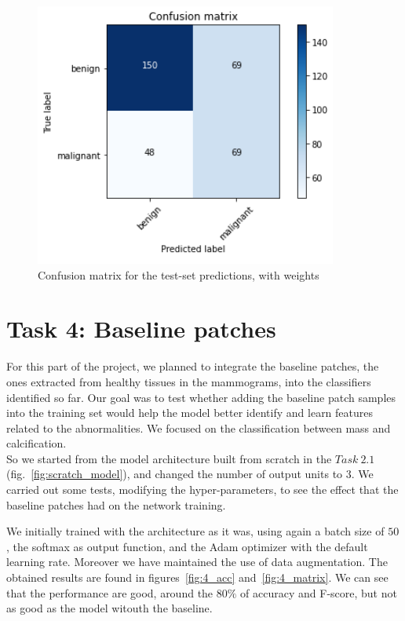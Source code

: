 \documentclass[11pt,a4paper,oneside]{article}
\begin{document}
\begin{figure}[h]
\begin{minipage}[c]{.4\textwidth}
		\includegraphics[width=.9\textwidth]{images/Task 3/VGG19 3.2/With Weights/Conf Matrix}
		\caption{Confusion matrix for the test-set predictions, with weights}
		\label{fig:vgg19_3.2_matrix}
	\end{minipage}%
\end{figure}

\clearpage

\section{Task 4: Baseline patches}
For this part of the project, we planned to integrate the baseline patches, the ones extracted from healthy tissues in the mammograms, into the classifiers identified so far. Our goal was to test whether adding the baseline patch samples into the training set would help the model better identify and learn features related to the abnormalities.
We focused on the classification between mass and calcification. \\
So we started from the model architecture built from scratch in the $Task\ 2.1$ (fig.~\ref{fig:scratch_model}), and changed the number of output units to $3$. We carried out some tests, modifying the hyper-parameters, to see the effect that the baseline patches had on the network training.

We initially trained with the architecture as it was, using again a batch size of $50$, the softmax as output function, and the Adam optimizer with the default learning rate. Moreover we have maintained the use of data augmentation. The obtained results are found in figures~\ref{fig:4_acc} and~\ref{fig:4_matrix}. We can see that the performance are good, around the $80\%$ of accuracy and F-score, but not as good as the model witouth the baseline. 
\end{document}
